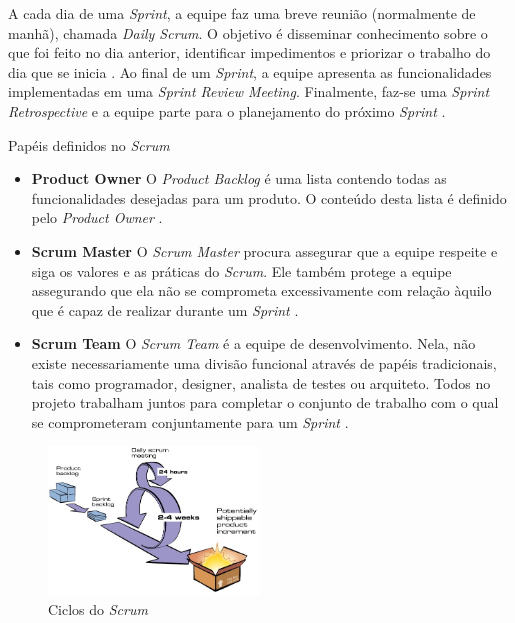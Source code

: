 \documentclass{acm_proc_article-sp}
\begin{document}
A cada dia de uma \textit{Sprint}, a equipe faz uma breve reunião (normalmente de manhã), chamada \textit{Daily Scrum}. O objetivo é disseminar conhecimento sobre o que foi feito no dia anterior, identificar impedimentos e priorizar o trabalho do dia que se inicia \cite{scrum:agil}. Ao final de um \textit{Sprint}, a equipe apresenta as funcionalidades implementadas em uma \textit{Sprint Review Meeting}. Finalmente, faz-se uma \textit{Sprint Retrospective} e a equipe parte para o planejamento do próximo \textit{Sprint} \cite{scrum:agil}.

Papéis definidos no \textit{Scrum}

\begin{itemize}
\item \textbf{Product Owner}  O \textit{Product Backlog} é uma lista contendo todas as funcionalidades desejadas para um produto. O conteúdo desta lista é definido pelo \textit{Product Owner} \cite{scrum:agil}.
\item \textbf{Scrum Master} O \textit{Scrum Master} procura assegurar que a equipe respeite e siga os valores e as práticas do \textit{Scrum}. Ele também protege a equipe assegurando que ela não se comprometa excessivamente com relação àquilo que é capaz de realizar durante um \textit{Sprint} \cite{scrum:agil}.
\item \textbf{Scrum Team} O \textit{Scrum Team} é a equipe de desenvolvimento. Nela, não existe necessariamente uma divisão funcional através de papéis tradicionais, tais como programador, designer, analista de testes ou arquiteto. Todos no projeto trabalham juntos para completar o conjunto de trabalho com o qual se comprometeram conjuntamente para um \textit{Sprint} \cite{scrum:agil}.
\end{itemize}


\begin{figure}[h]
\centering %
\includegraphics[width=0.5\textwidth]{scrumCiclo.JPG} %
\caption{Ciclos do \textit{Scrum} \cite{scrum:agil}}
\end{figure}
\end{document}
